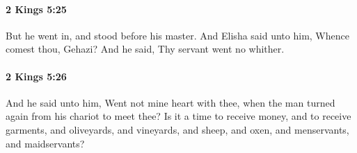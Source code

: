		\paragraph{2 Kings 5:25} %
			\label{2KINGS-5-25}

			But he went in, and stood before his master. And Elisha said unto him, Whence comest thou, Gehazi? And he said, Thy servant went no whither.


		\paragraph{2 Kings 5:26} %
			\label{2KINGS-5-26}

			And he said unto him, Went not mine heart with thee, when the man turned again from his chariot to meet thee? Is it a time to receive money, and to receive garments, and oliveyards, and vineyards, and sheep, and oxen, and menservants, and maidservants?

